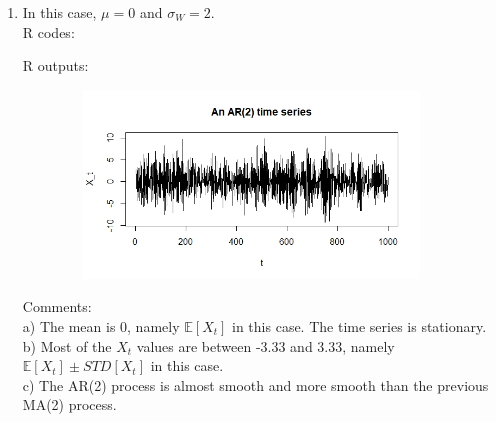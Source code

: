\documentclass[10pt]{article}
\begin{document}
\begin{enumerate}[1)]
\item
In this case, $\mu=0$ and $\sigma_W=2$.\\
R codes:

R outputs:
\begin{figure}[H]
  \centering
  \includegraphics[width=10cm,height=5cm]{p43a.jpeg}
\end{figure}
Comments:\\
a) The mean is 0, namely $\mathbb{E}[X_t]$ in this case. The time series is stationary.\\
b) Most of the $X_t$ values are between -3.33 and 3.33, namely $\mathbb{E}[X_t]\pm{STD[X_t]}$ in this case.\\
c) The AR(2) process is almost smooth and more smooth than the previous MA(2) process.
\vspace{3mm}


\end{enumerate}
\end{document}
